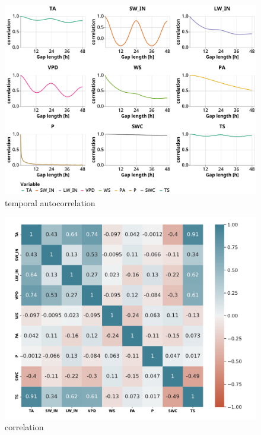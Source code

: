 \documentclass{article}
\begin{document}
\begin{figure}
    \centering
    \includegraphics[width=4.5in]{temporal_autocorrelation}%
    \caption{temporal autocorrelation}%
    \label{fig:temp_autocorr}
\end{figure} 
\begin{figure}
        \centering%
        \includegraphics[width=4.5in]{correlation}%
        \caption{correlation}%
        \label{fig:corr}%
\end{figure} 
\end{document}
